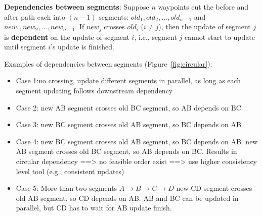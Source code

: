 
\begin{definition} 
{\bf Dependencies between segments}:
Suppose $n$ waypoints cut the before and after path each into $(n - 1)$ segments:
$old_1, old_2, ..., old_{n - 1}$ and $new_1, new_2, ..., new_{n - 1}$.
If $new_j$ crosses $old_i$ ($i \ne j$), then the update of segment $j$ is 
{\bf dependent} on the update of segment $i$, 
i.e., segment $j$ cannot start to update until segment $i$'s update is finished. 
\end{definition}

Examples of dependencies between segments (Figure~\ref{fig:circular}):

\begin{itemize}[noitemsep,topsep=0pt,leftmargin=*]

\item Case 1:no crossing, update different segments in parallel, as long as each segment
updating follows downstream dependency

\item Case 2: new AB segment crosses old BC segment, so AB depends on BC

\item Case 3: new BC segment crosses old AB segment, so BC depends on AB

\item Case 4: new BC segment crosses old AB segment, so BC depends on AB. new AB
segment crosses old BC segment, so AB depends on BC. Results in circular dependency ==>
no feasible order exist ==> use higher consistency level tool (e.g., consistent updates)

\item Case 5: More than two segments $A\rightarrow B\rightarrow C\rightarrow D$
new CD segment crosses old AB segment, so CD depends on AB.
AB and BC can be updated in parallel, but CD has to wait for AB update finish.
\end{itemize}

